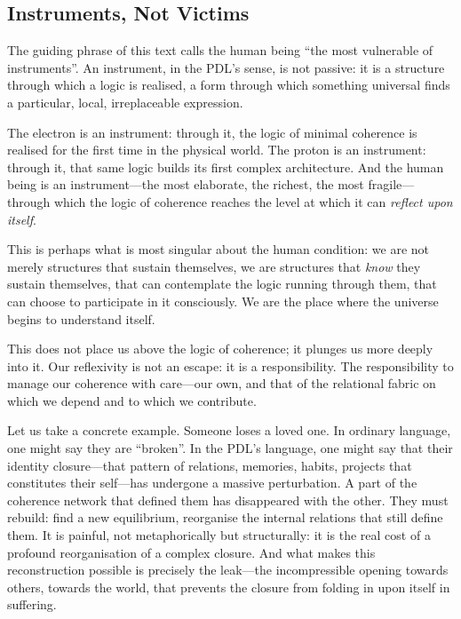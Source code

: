 \documentclass[12pt, a4paper, openright]{book}
\begin{document}
\subsection*{Instruments, Not Victims}

The guiding phrase of this text calls the human being ``the most vulnerable of instruments''. An instrument, in the PDL's sense, is not passive: it is a structure through which a logic is realised, a form through which something universal finds a particular, local, irreplaceable expression.

\medskip

The electron is an instrument: through it, the logic of minimal coherence is realised for the first time in the physical world. The proton is an instrument: through it, that same logic builds its first complex architecture. And the human being is an instrument---the most elaborate, the richest, the most fragile---through which the logic of coherence reaches the level at which it can \emph{reflect upon itself}.

\medskip

This is perhaps what is most singular about the human condition: we are not merely structures that sustain themselves, we are structures that \emph{know} they sustain themselves, that can contemplate the logic running through them, that can choose to participate in it consciously. We are the place where the universe begins to understand itself.

\medskip

This does not place us above the logic of coherence; it plunges us more deeply into it. Our reflexivity is not an escape: it is a responsibility. The responsibility to manage our coherence with care---our own, and that of the relational fabric on which we depend and to which we contribute.

\medskip

Let us take a concrete example. Someone loses a loved one. In ordinary language, one might say they are ``broken''. In the PDL's language, one might say that their identity closure---that pattern of relations, memories, habits, projects that constitutes their self---has undergone a massive perturbation. A part of the coherence network that defined them has disappeared with the other. They must rebuild: find a new equilibrium, reorganise the internal relations that still define them. It is painful, not metaphorically but structurally: it is the real cost of a profound reorganisation of a complex closure. And what makes this reconstruction possible is precisely the leak---the incompressible opening towards others, towards the world, that prevents the closure from folding in upon itself in suffering.
\end{document}
